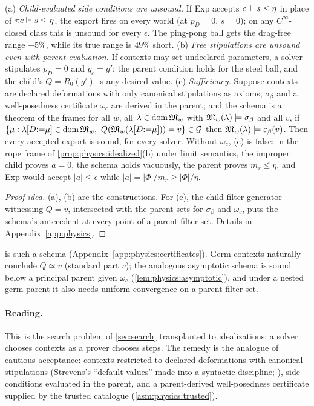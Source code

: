 \begin{theorem}\label{thm:physics:stipulation}
(a) \emph{Child-evaluated side conditions are unsound.} If Exp accepts $c\Vdash s\le\eta$ in
place of $\pi c\Vdash s\le\eta$, the export fires on every world (at $p_D=0$, $s=0$); on any
$C^\infty$-closed class this is unsound for every $\epsilon$. The ping-pong ball gets the
drag-free range $\pm5\%$, while its true range is $49\%$ short. (b) \emph{Free stipulations
are unsound even with parent evaluation.} If contexts may set undeclared parameters, a
solver stipulates $p_D=0$ and $g_c=g'$; the parent condition holds for the steel ball, and
the child's $Q=R_0(g')$ is any desired value. (c) \emph{Sufficiency.} Suppose contexts are
declared deformations with only canonical stipulations as axioms; $\sigma_\beta$ and a
well-posedness certificate $\omega_c$ are derived in the parent; and the schema is a
theorem of the frame: for all $w$, all $\lambda\in\operatorname{dom}\mathfrak{M}_w$ with
$\mathfrak{M}_w(\lambda)\models\sigma_\beta$ and all $v$, if
$\{\mu:\lambda[D{:=}\mu]\in\dom\fM_w,\ Q(\fM_w(\lambda[D{:=}\mu]))=v\}\in\fG$ then
$\mathfrak{M}_w(\lambda)\models\varepsilon_\beta(v)$. Then every accepted export is sound, for every
solver. Without $\omega_c$, (c) is false: in the rope frame of
\cref{prop:physics:idealized}(b) under limit semantics, the improper child proves $a=0$, the
schema holds vacuously, the parent proves $m_r\le\eta$, and Exp would accept $|a|\le\epsilon$
while $|a|=|\Phi|/m_r\ge|\Phi|/\eta$.
\end{theorem}
\begin{proof}[Proof idea]
(a), (b) are the constructions. For (c), the child-filter generator witnessing $Q=\bar v$,
intersected with the parent sets for $\sigma_\beta$ and $\omega_c$, puts the schema's
antecedent at every point of a parent filter set. Details in Appendix~\ref{app:physics}.
\end{proof}

 is such a schema (Appendix~\ref{app:physics:certificates}).
Germ contexts naturally conclude $Q\simeq v$ (standard part $v$); the analogous asymptotic
schema is sound below a principal parent given $\omega_c$
(\cref{lem:physics:asymptotic}), and under a nested germ parent it also needs uniform
convergence on a parent filter set.

\paragraph{Reading.} This is the search problem of \cref{sec:search} transplanted to
idealizations: a solver chooses contexts as a prover chooses steps. The remedy is the
analogue of cautious acceptance: contexts restricted to declared deformations with
canonical stipulations (Strevens's ``default values'' made into a syntactic discipline;
\citealt{strevens2008depth}), side conditions evaluated in the parent, and a parent-derived
well-posedness certificate supplied by the trusted catalogue (\cref{asm:physics:trusted}).

